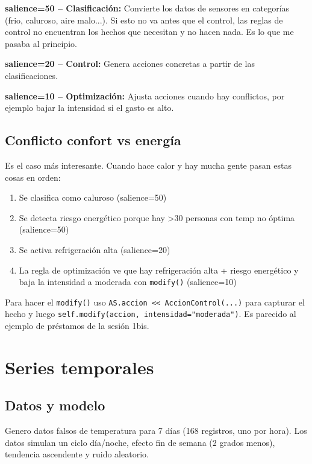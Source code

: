 \documentclass[12pt,a4paper]{article}
\begin{document}
\textbf{salience=50 -- Clasificaci\'on:} Convierte los datos de sensores en categor\'ias (frio, caluroso, aire malo...). Si esto no va antes que el control, las reglas de control no encuentran los hechos que necesitan y no hacen nada. Es lo que me pasaba al principio.

\textbf{salience=20 -- Control:} Genera acciones concretas a partir de las clasificaciones.

\textbf{salience=10 -- Optimizaci\'on:} Ajusta acciones cuando hay conflictos, por ejemplo bajar la intensidad si el gasto es alto.

\subsection{Conflicto confort vs energ\'ia}

Es el caso m\'as interesante. Cuando hace calor y hay mucha gente pasan estas cosas en orden:

\begin{enumerate}
    \item Se clasifica como caluroso (salience=50)
    \item Se detecta riesgo energ\'etico porque hay >30 personas con temp no \'optima (salience=50)
    \item Se activa refrigeraci\'on alta (salience=20)
    \item La regla de optimizaci\'on ve que hay refrigeraci\'on alta + riesgo energ\'etico y baja la intensidad a moderada con \texttt{modify()} (salience=10)
\end{enumerate}

Para hacer el \texttt{modify()} uso \texttt{AS.accion << AccionControl(...)} para capturar el hecho y luego \texttt{self.modify(accion, intensidad="moderada")}. Es parecido al ejemplo de pr\'estamos de la sesi\'on 1bis.

\newpage
\section{Series temporales}

\subsection{Datos y modelo}

Genero datos falsos de temperatura para 7 d\'ias (168 registros, uno por hora). Los datos simulan un ciclo d\'ia/noche, efecto fin de semana (2 grados menos), tendencia ascendente y ruido aleatorio.
\end{document}
